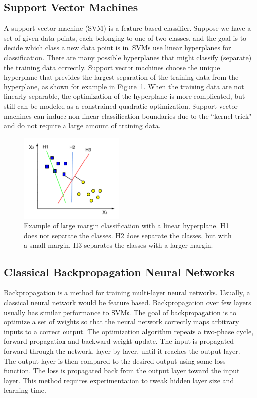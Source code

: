 \subsection{Support Vector Machines}
A support vector machine (SVM) is a feature-based classifier. Suppose we have a set of given data points, each belonging to one of two classes, and the goal is to decide which class a new data point is in. SVMs use linear hyperplanes for classification. There are many possible hyperplanes that might classify (separate) the training data correctly. Support vector machines choose the unique hyperplane that provides the largest separation of the training data from the hyperplane, as shown for example in Figure~\ref{fig:svm}. When the training data are not linearly separable, the optimization of the hyperplane is more complicated, but still can be modeled as a constrained quadratic optimization. Support vector machines can induce non-linear classification boundaries due to the \textquotedblleft kernel trick" and do not require a large amount of training data.

\begin{figure}[t]
  \centering
  \includegraphics[width=2in]{figures/svm.jpg}   
  \caption[svm]{Example of large margin classification with a linear hyperplane. H1 does not separate the classes. H2 does separate the classes, but with a small margin. H3 separates the classes with a larger margin. }
  \label{fig:svm}
\end{figure}


\subsection{Classical Backpropagation Neural Networks}
Backpropagation is a method for training multi-layer neural networks. Usually, a classical neural network would be feature based. Backpropagation over few layers usually has  similar performance to SVMs. The goal of backpropagation is to optimize a set of weights so that the neural network correctly maps arbitrary inputs to a correct output. The optimization algorithm repeats a two-phase cycle, forward propagation and backward weight update. The input is propagated forward through the network, layer by layer, until it reaches the output layer. The output layer is then compared to the desired output using some loss function. The loss is propagated back from the output layer toward the input layer. This method requires  experimentation to tweak hidden layer size and learning time.

